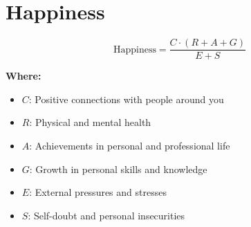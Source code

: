 \chapter{Happiness}

\begin{equation}
\text{Happiness} = \frac{C \cdot (R + A + G)}{E + S}
\end{equation}

\textbf{Where:}

\begin{itemize}
    \item $C$: Positive connections with people around you
    \item $R$: Physical and mental health
    \item $A$: Achievements in personal and professional life
    \item $G$: Growth in personal skills and knowledge
    \item $E$: External pressures and stresses
    \item $S$: Self-doubt and personal insecurities
\end{itemize}